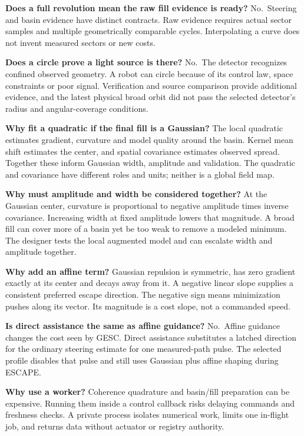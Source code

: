 \documentclass[
  10pt,
  letterpaper,
]{article}
\begin{document}
\textbf{Does a full revolution mean the raw fill evidence is ready?}
No.~Steering and basin evidence have distinct contracts. Raw evidence
requires actual sector samples and multiple geometrically comparable
cycles. Interpolating a curve does not invent measured sectors or new
costs.

\textbf{Does a circle prove a light source is there?} No.~The detector
recognizes confined observed geometry. A robot can circle because of its
control law, space constraints or poor signal. Verification and source
comparison provide additional evidence, and the latest physical broad
orbit did not pass the selected detector's radius and angular-coverage
conditions.

\textbf{Why fit a quadratic if the final fill is a Gaussian?} The local
quadratic estimates gradient, curvature and model quality around the
basin. Kernel mean shift estimates the center, and spatial covariance
estimates observed spread. Together these inform Gaussian width,
amplitude and validation. The quadratic and covariance have different
roles and units; neither is a global field map.

\textbf{Why must amplitude and width be considered together?} At the
Gaussian center, curvature is proportional to negative amplitude times
inverse covariance. Increasing width at fixed amplitude lowers that
magnitude. A broad fill can cover more of a basin yet be too weak to
remove a modeled minimum. The designer tests the local augmented model
and can escalate width and amplitude together.

\textbf{Why add an affine term?} Gaussian repulsion is symmetric, has
zero gradient exactly at its center and decays away from it. A negative
linear slope supplies a consistent preferred escape direction. The
negative sign means minimization pushes along its vector. Its magnitude
is a cost slope, not a commanded speed.

\textbf{Is direct assistance the same as affine guidance?} No.~Affine
guidance changes the cost seen by GESC. Direct assistance substitutes a
latched direction for the ordinary steering estimate for one
measured-path pulse. The selected profile disables that pulse and still
uses Gaussian plus affine shaping during ESCAPE.

\textbf{Why use a worker?} Coherence quadrature and basin/fill
preparation can be expensive. Running them inside a control callback
risks delaying commands and freshness checks. A private process isolates
numerical work, limits one in-flight job, and returns data without
actuator or registry authority.
\end{document}
